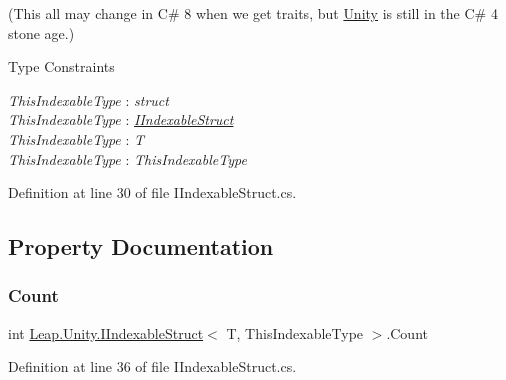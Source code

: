 (This all may change in C\# 8 when we get traits, but \mbox{\hyperlink{namespace_leap_1_1_unity}{Unity}} is still in the C\# 4 stone age.) \begin{Desc}
\item[Type Constraints]\begin{description}
\item[{\em This\+Indexable\+Type} : {\em struct}]\item[{\em This\+Indexable\+Type} : {\em \mbox{\hyperlink{interface_leap_1_1_unity_1_1_i_indexable_struct}{I\+Indexable\+Struct}}}]\item[{\em This\+Indexable\+Type} : {\em T}]\item[{\em This\+Indexable\+Type} : {\em This\+Indexable\+Type}]\end{description}
\end{Desc}


Definition at line 30 of file I\+Indexable\+Struct.\+cs.



\subsection{Property Documentation}
\mbox{\label{interface_leap_1_1_unity_1_1_i_indexable_struct_ad6584007443da506772ba213121443d5}} 
\subsubsection{\texorpdfstring{Count}{Count}}
{\footnotesize\ttfamily int \mbox{\hyperlink{interface_leap_1_1_unity_1_1_i_indexable_struct}{Leap.\+Unity.\+I\+Indexable\+Struct}}$<$ T, This\+Indexable\+Type $>$.Count\hspace{0.3cm}{\ttfamily [get]}}



Definition at line 36 of file I\+Indexable\+Struct.\+cs.

\mbox{\label{interface_leap_1_1_unity_1_1_i_indexable_struct_ad7283ee0dd67d3a6c03fd76050ec220b}} 
